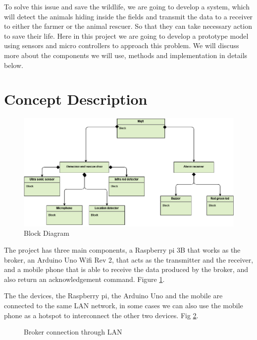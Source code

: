\documentclass[12pt]{article}
\begin{document}
To solve this issue and save the wildlife, we are going to develop a system, which will detect the animals hiding inside the fields and transmit the data to a receiver to either the farmer or the animal rescuer. So that they can take necessary action to save their life. Here in this project we are going to develop a prototype model using sensors and micro controllers to approach this problem. We will discuss more about the components we will use, methods and implementation in details below.


\section{Concept Description}

\begin{figure}[!h]
\includegraphics[scale=0.6]{img/block_diagram.png}
\caption{Block Diagram}
\label{fig::bd}
\end{figure}

The project has three main components, a Raspberry pi 3B that works as the broker, an Arduino Uno Wifi Rev 2, that acts as the transmitter and the receiver, and a mobile phone that is able to receive the data produced by the broker, and also return an acknowledgement command. Figure \ref{fig::bd}. 

The the devices, the Raspberry pi, the Arduino Uno and the mobile are connected to the same LAN network, in some cases we can also use the mobile phone as a hotspot to interconnect the other two devices. Fig \ref{fig::broker}.

\begin{figure}[!h]
\caption{Broker connection through LAN}
\label{fig::broker}
\end{figure}
\end{document}
